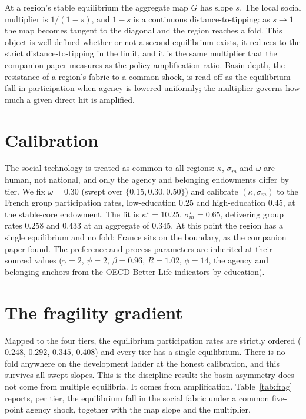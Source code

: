 \documentclass[11pt]{article}
\begin{document}
At a region's stable equilibrium the aggregate map $G$ has slope $s$. The
local social multiplier is $1/(1-s)$, and $1-s$ is a continuous
distance-to-tipping: as $s \to 1$ the map becomes tangent to the diagonal
and the region reaches a fold. This object is well defined whether or not a
second equilibrium exists, it reduces to the strict distance-to-tipping in
the limit, and it is the same multiplier that the companion paper measures
as the policy amplification ratio. Basin depth, the resistance of a region's
fabric to a common shock, is read off as the equilibrium fall in
participation when agency is lowered uniformly; the multiplier governs how
much a given direct hit is amplified.

\section{Calibration}

The social technology is treated as common to all regions: $\kappa$,
$\sigma_m$ and $\omega$ are human, not national, and only the agency and
belonging endowments differ by tier. We fix $\omega = 0.30$ (swept over
$\{0.15, 0.30, 0.50\}$) and calibrate $(\kappa, \sigma_m)$ to the French
group participation rates, low-education $0.25$ and high-education $0.45$,
at the stable-core endowment. The fit is $\kappa^\star = 10.25$,
$\sigma_m^\star = 0.65$, delivering group rates $0.258$ and $0.433$ at an
aggregate of $0.345$. At this point the region has a single equilibrium and
no fold: France sits on the boundary, as the companion paper found. The
preference and process parameters are inherited at their sourced values
($\gamma=2$, $\psi=2$, $\beta=0.96$, $R=1.02$, $\phi=14$, the agency and
belonging anchors from the OECD Better Life indicators by education).

\section{The fragility gradient}

Mapped to the four tiers, the equilibrium participation rates are strictly
ordered ($0.248$, $0.292$, $0.345$, $0.408$) and every tier has a single
equilibrium. There is no fold anywhere on the development ladder at the
honest calibration, and this survives all swept slopes. This is the
discipline result: the basin asymmetry does not come from multiple
equilibria. It comes from amplification. Table~\ref{tab:frag} reports, per
tier, the equilibrium fall in the social fabric under a common five-point
agency shock, together with the map slope and the multiplier.
\end{document}
